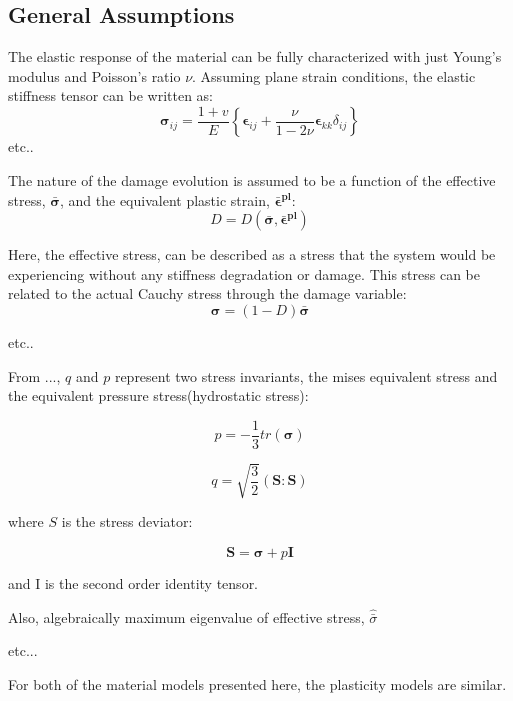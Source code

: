 \subsection{General Assumptions}
The elastic response of the material can be fully characterized with just Young's modulus and Poisson's ratio $\nu$. Assuming plane strain conditions, the elastic stiffness tensor can be written as:
\begin{equation}
\boldsymbol{\sigma}_{ij}=\frac{1+v}{E}\left\{\boldsymbol{\epsilon}_{ij}+\frac{\nu}{1-2\nu}\boldsymbol{\epsilon}_{kk}\delta_{ij}\right\}
\label{eqn:const8a}
\end{equation}
etc..

The nature of the damage evolution is assumed to be a function of the effective stress, $\boldsymbol{\bar{\sigma}}$, and the equivalent plastic strain, $\boldsymbol{\bar{\epsilon}^{pl}}$:
\begin{equation}
D=D(\boldsymbol{\bar{\sigma}},\boldsymbol{\bar{\epsilon}^{pl}})\label{eqn:const8}
\end{equation}



Here, the effective stress,  can be described as a stress that the system would be experiencing without any stiffness degradation or damage. This stress can be related to the actual Cauchy stress through the damage variable: 
\begin{equation}
\boldsymbol{\sigma}=(1-D)\boldsymbol{\bar{\sigma}}\label{eqn:const7}
\end{equation}

etc..

From ..., $q$ and $p$ represent two stress invariants, the mises
equivalent stress and the equivalent pressure stress(hydrostatic stress):

\begin{equation}
p=-\frac{1}{3}tr\left(\boldsymbol{\sigma}\right)\label{eqn:druc3}
\end{equation}


\begin{equation}
q=\sqrt{\frac{3}{2}}\left(\mathbf{S}:\mathbf{S}\right)\label{eqn:druc4}
\end{equation}


where $S$ is the stress deviator:

\begin{equation}
\mathbf{S}=\boldsymbol{\sigma}+p\mathbf{I}\label{eqn:druc4-1}
\end{equation}


and I is the second order identity tensor. 


Also, algebraically maximum eigenvalue of effective stress, $\hat{\bar{\sigma}}$


etc...

For both of the material models presented here, the plasticity models are similar. 